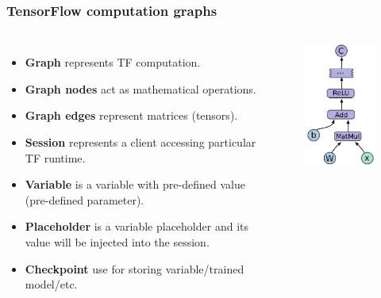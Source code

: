 \documentclass[10pt,utf8]{beamer}
\begin{document}
\begin{frame}
	\frametitle{TensorFlow computation graphs}
	\begin{columns}
		\begin{itemize}
			\item \textbf{Graph} represents TF computation.
			\pause
			\item \textbf{Graph nodes} act as mathematical operations.
			\pause
			\item \textbf{Graph edges} represent matrices (tensors).
			\pause
			\item \textbf{Session} represents a client accessing particular TF runtime.
			\pause
			\item \textbf{Variable} is a variable with pre-defined value (pre-defined parameter).
			\pause
			\item \textbf{Placeholder} is a variable placeholder and its value will be injected into the session.
			\pause
			\item \textbf{Checkpoint} use for storing variable/trained model/etc.
		\end{itemize}
		\vspace{-1.5cm}
		\hspace{-1cm}
		\begin{figure}
			\centering
			\includegraphics[width=4cm]{./img/tensorflow_graph.eps}
		\end{figure}
	\end{columns}
\end{frame}
\end{document}
